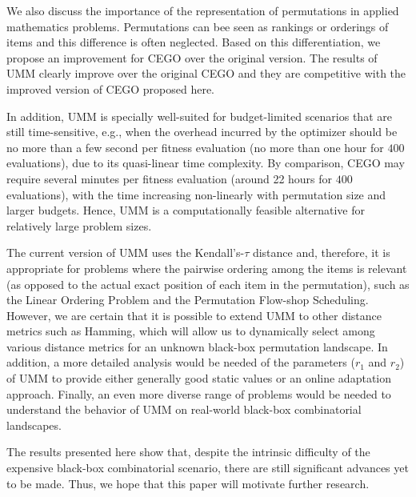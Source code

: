 \documentclass[sigconf,dvipsnames]{acmart}
\newcommand{\ken}{Kendall's-$\tau$\xspace}
\begin{document}
We also discuss the importance of the representation of permutations in applied mathematics problems. Permutations can bee seen as rankings or orderings of items and this difference is often neglected. Based on this differentiation, we propose an improvement for CEGO over the original version. The results of UMM clearly improve over the original CEGO and they are competitive with the improved version of CEGO proposed here.

In addition, UMM is specially well-suited for budget-limited scenarios that are still time-sensitive, e.g., when the overhead incurred by the optimizer should
be no more than a few second per fitness evaluation (no more than one hour for $400$ evaluations), due to its quasi-linear time complexity.
By comparison, CEGO may require several minutes per fitness evaluation (around 22 hours for $400$ evaluations), with the time increasing non-linearly with permutation size and larger budgets.  Hence, UMM is a computationally feasible alternative for relatively large problem sizes.

The current version of UMM uses the \ken distance and, therefore, it is appropriate for problems where the pairwise ordering among the items is relevant (as opposed to the actual exact position of each item in the permutation), such as the Linear Ordering Problem and the Permutation Flow-shop Scheduling.
However, we are certain that it is
possible to extend UMM to other distance metrics such as Hamming, which will allow us to
 dynamically select among various distance metrics for an unknown black-box permutation landscape.
In addition, a more detailed analysis would be needed of the parameters ($r_1$ and $r_2$) of UMM to provide either
generally good static values or an online adaptation approach.
Finally, an even more diverse range of problems would be
needed to understand the behavior of UMM on real-world black-box combinatorial
landscapes.

The results presented here show that, despite the intrinsic difficulty of the expensive black-box combinatorial scenario, there are still significant advances yet to be made. Thus, we hope that this paper will motivate further research. 


\end{document}
